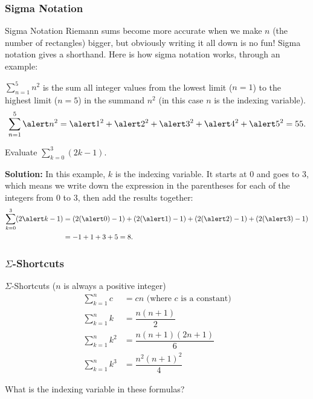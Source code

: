 \documentclass[cal1spr16Lectures.tex]{subfiles}
\begin{document}
\subsubsection{Sigma Notation}

\begin{frame}{\small Sigma Notation}\footnotesize
Riemann sums become more accurate when we make $n$ (the number of rectangles) bigger, but obviously writing it all down is no fun!  Sigma notation gives a shorthand.  Here is how sigma notation works, through an example: 
\begin{ex} 
$\sum_{n=1}^5 n^2$ is the sum all integer values from the lowest limit ($n=1$) to the highest limit ($n=5$) in the summand $n^2$ (in this case $n$ is the indexing variable).  
\[\sum_{n=1}^5 \alert n^2 = \alert 1^2+\alert 2^2+\alert 3^2+\alert 4^2+\alert 5^2=55.\] 
\end{ex}
\end{frame}

\begin{frame}\small
\begin{ex} 
Evaluate $\sum_{k=0}^3 (2k-1)$. 
\end{ex}
\footnotesize
{\bf Solution:} In this example, $k$ is the indexing variable.  It starts at $0$ and goes to $3$, which means we write down the expression in the parentheses for each of the integers from $0$ to $3$, then add the results together:
\begin{align*}
\sum_{k=0}^3(2\alert k-1) &= (2(\alert 0)-1)+(2(\alert 1)-1)+(2(\alert 2)-1)+(2(\alert 3)-1) \\
	&= -1+1+3+5 = 8.
\end{align*}
\end{frame}

\subsubsection{$\Sigma$-Shortcuts}

\begin{frame}{\small $\Sigma$-Shortcuts}\footnotesize
($n$ is always a positive integer)
\vspace{-1pc}
\begin{align*}
\sum_{k=1}^n c & = cn \text{ (where $c$ is a constant)} \\%
\sum_{k=1}^n k &= \dfrac{n(n+1)}{2} \\%
\sum_{k=1}^n k^2 &= \dfrac{n(n+1)(2n+1)}{6} \\%
\sum_{k=1}^n k^3 &= \dfrac{n^2(n+1)^2}{4}
\end{align*}
\vspace{-1.5pc}
\begin{que}
What is the indexing variable in these formulas?
\end{que}
\end{frame}
\end{document}
